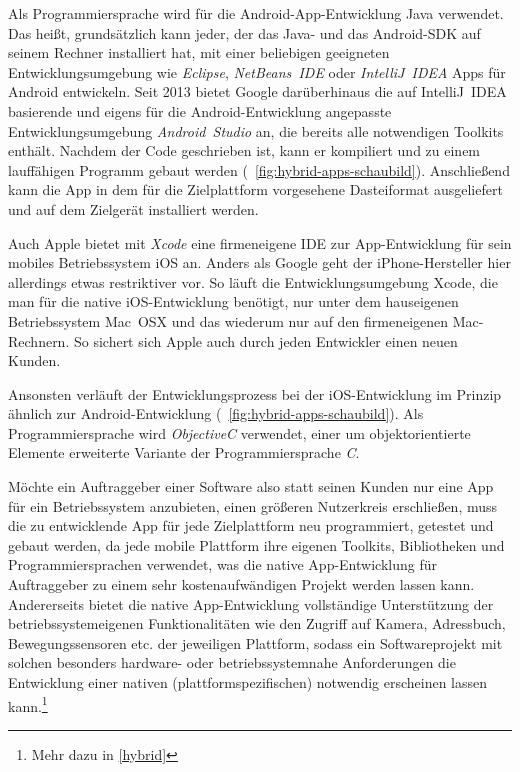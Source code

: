 Als Programmiersprache wird für die Android-App-Entwicklung Java verwendet. Das heißt, grundsätzlich kann jeder, der das Java- und das Android-SDK auf seinem Rechner installiert hat, mit einer beliebigen geeigneten Entwicklungsumgebung wie \emph{Eclipse}, \emph{NetBeans~IDE} oder \emph{IntelliJ~IDEA} Apps für Android entwickeln. 
Seit 2013 bietet Google darüberhinaus die auf IntelliJ~IDEA basierende und eigens für die Android-Entwicklung angepasste Entwicklungsumgebung \emph{Android~Studio} an,\cite{android-studio} die bereits alle notwendigen Toolkits enthält. 
Nachdem der Code geschrieben ist, kann er kompiliert und zu einem lauffähigen Programm gebaut werden (\seename\ \autoref{fig:hybrid-apps-schaubild}). Anschließend kann die App in dem für die Zielplattform vorgesehene Dasteiformat ausgeliefert und auf dem Zielgerät installiert werden.

Auch Apple bietet mit \emph{Xcode} eine firmeneigene IDE zur App-Entwicklung für sein mobiles Betriebssystem iOS an. Anders als Google geht der iPhone-Hersteller hier allerdings etwas restriktiver vor. So läuft die Entwicklungsumgebung Xcode, die man für die native iOS-Entwicklung benötigt, nur unter dem hauseigenen Betriebssystem Mac~OSX und das wiederum nur auf den firmeneigenen Mac-Rechnern. So sichert sich Apple auch durch jeden Entwickler einen neuen Kunden.

Ansonsten verläuft der Entwicklungsprozess bei der iOS-Entwicklung im Prinzip ähnlich zur Android-Entwicklung (\seename\ \autoref{fig:hybrid-apps-schaubild}).
Als Programmiersprache wird \emph{ObjectiveC} verwendet, einer um objektorientierte Elemente erweiterte Variante der Programmiersprache \emph{C}.

Möchte ein Auftraggeber einer Software also statt seinen Kunden nur eine App für ein Betriebssystem anzubieten, einen größeren Nutzerkreis erschließen, muss die zu entwicklende App für jede Zielplattform neu programmiert, getestet und gebaut werden, da jede mobile Plattform ihre eigenen Toolkits, Bibliotheken und Programmiersprachen verwendet, was die native App-Entwicklung für Auftraggeber zu einem sehr kostenaufwändigen Projekt werden lassen kann.
Andererseits bietet die native App-Entwicklung vollständige Unterstützung der betriebssystemeigenen Funktionalitäten wie den Zugriff auf Kamera, Adressbuch, Bewegungssensoren etc. der jeweiligen Plattform, sodass ein Softwareprojekt mit solchen besonders hardware- oder betriebssystemnahe Anforderungen die Entwicklung einer nativen (plattformspezifischen) notwendig erscheinen lassen kann.\footnote{Mehr dazu in \autoref{hybrid}}

